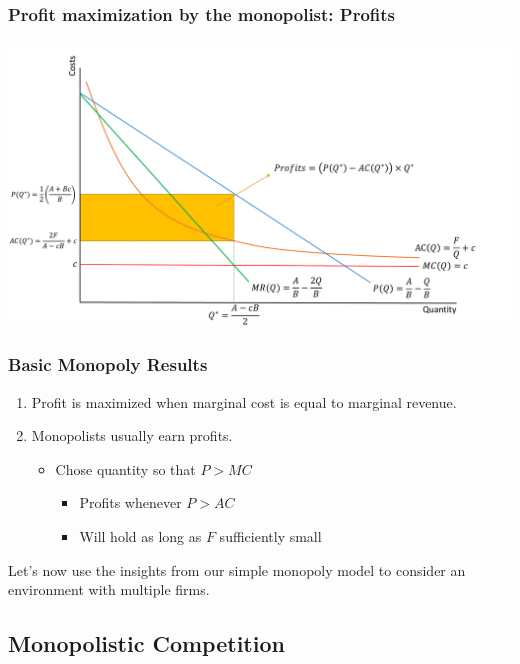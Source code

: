 \documentclass{beamer}
\begin{document}
\begin{frame}
	\frametitle{Profit maximization by the monopolist: Profits}
	
	\includegraphics[scale=0.30]{SL2_4.pdf}
\end{frame}


\begin{frame}
	\frametitle{Basic Monopoly Results}
\begin{enumerate}
	\item Profit is maximized when marginal cost is equal to marginal revenue.
	\item Monopolists usually earn profits.
		\begin{itemize}
			\item Chose quantity so that $P>MC$
							\begin{itemize}
								\item Profits whenever $P>AC$
								\item Will hold as long as $F$ sufficiently small
							\end{itemize}
		\end{itemize}
\end{enumerate}

Let's now use the insights from our simple monopoly model to consider an environment with multiple firms.
\end{frame}

\subsection{Monopolistic Competition}
\end{document}
